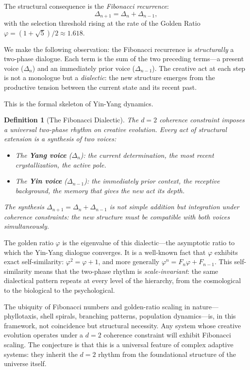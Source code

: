 \documentclass[12pt,a4paper]{article}
\newtheorem{definition}{Definition}[section]
\begin{document}
The structural consequence is the \emph{Fibonacci recurrence}:
\begin{equation}
\Delta_{n+1} = \Delta_n + \Delta_{n-1},
\label{eq:fibonacci}
\end{equation}
with the selection threshold rising at the rate of the Golden Ratio $\varphi = (1 + \sqrt{5})/2 \approx 1.618$.

We make the following observation: the Fibonacci recurrence is \emph{structurally} a two-phase dialogue. Each term is the sum of the two preceding terms---a present voice ($\Delta_n$) and an immediately prior voice ($\Delta_{n-1}$). The creative act at each step is not a monologue but a \emph{dialectic}: the new structure emerges from the productive tension between the current state and its recent past.

This is the formal skeleton of Yin-Yang dynamics.

\begin{definition}[The Fibonacci Dialectic]
\label{def:fibonacci_dialectic}
The $d = 2$ coherence constraint imposes a \emph{universal two-phase rhythm} on creative evolution. Every act of structural extension is a synthesis of two voices:
\begin{itemize}[leftmargin=2em]
\item The \textbf{Yang voice} ($\Delta_n$): the current determination, the most recent crystallization, the active pole.
\item The \textbf{Yin voice} ($\Delta_{n-1}$): the immediately prior context, the receptive background, the memory that gives the new act its depth.
\end{itemize}
The synthesis $\Delta_{n+1} = \Delta_n + \Delta_{n-1}$ is not simple addition but \emph{integration under coherence constraints}: the new structure must be compatible with both voices simultaneously.
\end{definition}

The golden ratio $\varphi$ is the eigenvalue of this dialectic---the asymptotic ratio to which the Yin-Yang dialogue converges. It is a well-known fact that $\varphi$ exhibits exact self-similarity: $\varphi^2 = \varphi + 1$, and more generally $\varphi^n = F_n \varphi + F_{n-1}$. This self-similarity means that the two-phase rhythm is \emph{scale-invariant}: the same dialectical pattern repeats at every level of the hierarchy, from the cosmological to the biological to the psychological.

The ubiquity of Fibonacci numbers and golden-ratio scaling in nature---phyllotaxis, shell spirals, branching patterns, population dynamics---is, in this framework, not coincidence but structural necessity. Any system whose creative evolution operates under a $d = 2$ coherence constraint will exhibit Fibonacci scaling. The conjecture is that this is a universal feature of complex adaptive systems: they inherit the $d = 2$ rhythm from the foundational structure of the universe itself.
\end{document}
